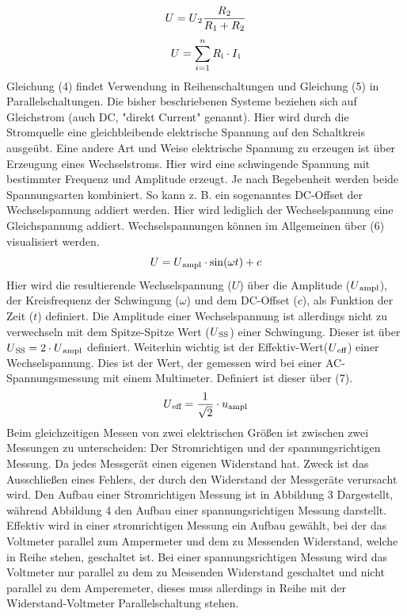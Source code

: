 \documentclass[11pt]{article}
\begin{document}
	\begin{equation}
	U=U\textsubscript{2}\frac{R\textsubscript{2}}{R\textsubscript{1}+R\textsubscript{2}}\\
	\end{equation}
	\begin{equation}	
	U=\sum_{i=1}^{n}R\textsubscript{i}\cdot I\textsubscript{i}
	\end{equation}
Gleichung (4) findet Verwendung in Reihenschaltungen und Gleichung (5) in Parallelschaltungen. Die bisher beschriebenen Systeme beziehen sich auf Gleichstrom (auch DC, "direkt Current" genannt). Hier wird durch die Stromquelle eine gleichbleibende elektrische Spannung auf den Schaltkreis ausgeübt. Eine andere Art und Weise elektrische Spannung zu erzeugen ist über Erzeugung eines Wechselstroms. Hier wird eine schwingende Spannung mit bestimmter Frequenz und Amplitude erzeugt. Je nach Begebenheit werden beide Spannungsarten kombiniert. So kann z. B. ein sogenanntes DC-Offset der Wechselspannung addiert werden. Hier wird lediglich der Wechselspannung eine Gleichspannung addiert. Wechselspannungen können im Allgemeinen über (6) visualisiert werden.	
	\begin{equation}
	U=U\textsubscript{ampl}\cdot \sin(\omega t)+c
	\end{equation}
Hier wird die resultierende Wechselspannung ($U$) über die Amplitude ($U\textsubscript{ampl}$), der Kreisfrequenz der Schwingung ($\omega$) und dem DC-Offset ($c$), als Funktion der Zeit ($t$) definiert. Die Amplitude einer Wechselspannung ist allerdings nicht zu verwechseln mit dem Spitze-Spitze Wert ($U\textsubscript{SS}$) einer Schwingung. Dieser ist über $U\textsubscript{SS}=2\cdot U\textsubscript{ampl}$ definiert. Weiterhin wichtig ist der Effektiv-Wert($U\textsubscript{eff}$) einer Wechselspannung. Dies ist der Wert, der gemessen wird bei einer AC-Spannungsmessung mit einem Multimeter. Definiert ist dieser über (7).
	\begin{equation}
	U\textsubscript{eff}=\frac{1}{\sqrt{2}}\cdot u\textsubscript{ampl}
	\end{equation}
Beim gleichzeitigen Messen von zwei elektrischen Größen ist zwischen zwei Messungen zu unterscheiden: Der Stromrichtigen und der spannungsrichtigen Messung. Da jedes Messgerät einen eigenen Widerstand hat. Zweck ist das Ausschließen eines Fehlers, der durch den Widerstand der Messgeräte verursacht wird. Den Aufbau einer Stromrichtigen Messung ist in Abbildung 3 Dargestellt, während Abbildung 4 den Aufbau einer spannungsrichtigen Messung darstellt. Effektiv wird in einer stromrichtigen Messung ein Aufbau gewählt, bei der das Voltmeter parallel zum Ampermeter und dem zu Messenden Widerstand, welche in Reihe stehen, geschaltet ist. Bei einer spannungsrichtigen Messung wird das Voltmeter nur parallel zu dem zu Messenden Widerstand geschaltet und nicht parallel zu dem Amperemeter, dieses muss allerdings in Reihe mit der Widerstand-Voltmeter Parallelschaltung stehen.\\
\end{document}
